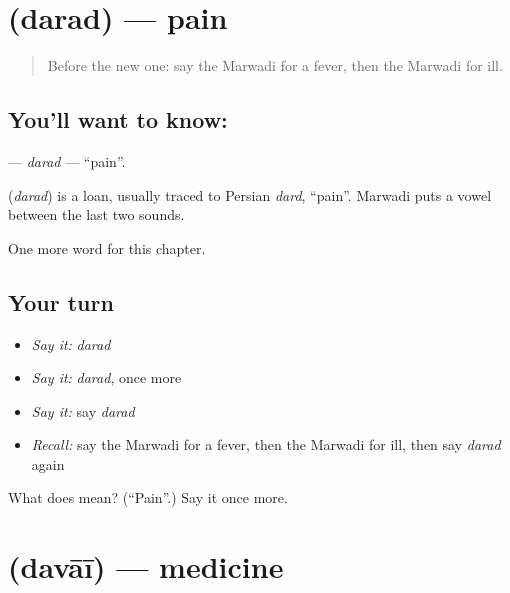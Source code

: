 \section[\texorpdfstring{\mw{दरद} (darad)}{दरद (darad)}]{ (darad) — pain}

\label{lesson:MW-C47-darad}



\begin{quote}
Before the new one: say the Marwadi for a fever, then the Marwadi for ill.
\end{quote}

\subsection*{You'll want to know: }
\textbf{} — \emph{darad} — \textquotedblleft{}pain\textquotedblright{}.

\begin{cousinweb}
\textbf{} (\emph{darad}) is a loan, usually traced to Persian \emph{dard}, \textquotedblleft{}pain\textquotedblright{}. Marwadi puts a vowel between the last two sounds.
\end{cousinweb}

\begin{grammarlens}[title={What you've built}]
One more word for this chapter.
\end{grammarlens}

\subsection*{Your turn}
\begin{itemize}
\raggedright
  \item \emph{Say it:} \emph{darad}
  \item \emph{Say it:} \emph{darad}, once more
  \item \emph{Say it:} say \emph{darad}
  \item \emph{Recall:} say the Marwadi for a fever, then the Marwadi for ill, then say \emph{darad} again
\end{itemize}

\begin{tcolorbox}[breakable,colback=teal!4,colframe=teal!35!black,title={Before you move on}]
What does  mean? (\textquotedblleft{}Pain\textquotedblright{}.) Say it once more.
\end{tcolorbox}
\section[\texorpdfstring{\mw{दवाई} (davāī)}{दवाई (davāī)}]{ (davāī) — medicine}

